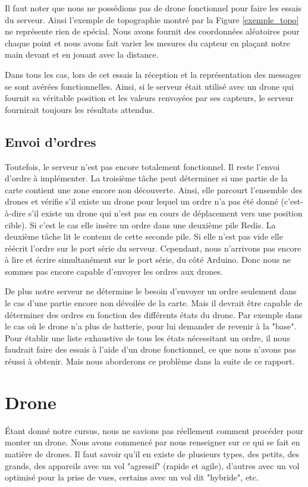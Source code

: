 \documentclass[a4paper,10pt]{report}
\begin{document}
      Il faut noter que nous ne possédions pas de drone fonctionnel pour faire 
les essais du serveur. Ainsi l'exemple de topographie montré par la 
Figure \ref{exemple_topo} ne représente rien de spécial. Nous avons fournit des 
coordonnées aléatoires pour chaque point et nous avons fait varier les mesures 
du capteur en plaçant notre main devant et en jouant avec la distance.

      Dans tous les cas, lors de cet essais la réception et la représentation 
des messages se sont avérées fonctionnelles. Ainsi, si le serveur était utilisé 
avec un drone qui fournit sa véritable position et les valeurs renvoyées par 
ses capteurs, le serveur fournirait toujours les résultats attendus.

    \section{Envoi d'ordres}
      Toutefois, le serveur n'est pas encore totalement fonctionnel. Il reste 
l'envoi d'ordre à implémenter. La troisième tâche peut déterminer si une partie 
de la carte contient une zone encore non découverte. Ainsi, elle parcourt 
l'ensemble des drones et vérifie s'il existe un drone pour lequel un ordre n'a 
pas été donné (c'est-à-dire s'il existe un drone qui n'est pas en cours de 
déplacement vers une position cible). Si c'est le cas elle insère un ordre dans 
une deuxième pile Redis. La deuxième tâche lit le contenu de cette seconde 
pile. Si elle n'est pas vide elle réécrit l'ordre sur le port série du serveur. 
Cependant, nous n'arrivons pas encore à lire et écrire simultanément sur le 
port série, du côté Arduino. Donc nous ne sommes pas encore capable d'envoyer 
les ordres aux drones.

      De plus notre serveur ne détermine le besoin d'envoyer un ordre seulement 
dans le cas d'une partie encore non dévoilée de la carte. Mais il devrait être 
capable de déterminer des ordres en fonction des différents états du drone. Par 
exemple dans le cas où le drone n'a plus de batterie, pour lui demander de 
revenir à la "base". Pour établir une liste exhaustive de tous les états 
nécessitant un ordre, il nous faudrait faire des essais à l'aide d'un drone 
fonctionnel, ce que nous n'avons pas réussi à obtenir. Mais nous aborderons ce 
problème dans la suite de ce rapport.
	

  \chapter{Drone}
    Étant donné notre cursus, nous ne savions pas réellement comment procéder 
pour monter un drone. Nous avons commencé par nous renseigner sur ce qui se 
fait en matière de drones. Il faut savoir qu'il en existe de plusieurs types, 
des petits, des grands, des appareils avec un vol "agressif" (rapide et agile), 
d'autres avec un vol optimisé pour la prise de vues, certains avec un vol dit 
"hybride", etc.
    
\end{document}
